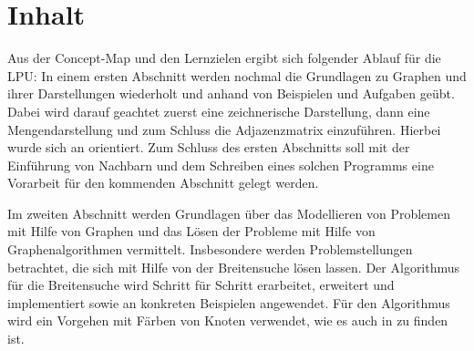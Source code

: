 \section{Inhalt}\label{lpu:inhalt}

Aus der Concept-Map und den Lernzielen ergibt sich folgender Ablauf für die LPU:
In einem ersten Abschnitt werden nochmal die Grundlagen zu Graphen und ihrer Darstellungen wiederholt und anhand von Beispielen und Aufgaben geübt. 
Dabei wird darauf geachtet zuerst eine zeichnerische Darstellung, dann eine Mengendarstellung und zum Schluss die Adjazenzmatrix einzuführen. 
Hierbei wurde sich an \cite{cormen,ottmann} orientiert.
Zum Schluss des ersten Abschnitts soll mit der Einführung von Nachbarn und dem Schreiben eines solchen Programms eine Vorarbeit für den kommenden Abschnitt gelegt werden.

Im zweiten Abschnitt werden Grundlagen \"uber das Modellieren von Problemen mit Hilfe von Graphen und das L\"osen der Probleme mit Hilfe von Graphenalgorithmen vermittelt. Insbesondere werden Problemstellungen betrachtet, die sich mit Hilfe von der Breitensuche l\"osen lassen. Der Algorithmus f\"ur die Breitensuche wird Schritt f\"ur Schritt erarbeitet, erweitert und implementiert sowie an konkreten Beispielen angewendet. F\"ur den Algorithmus wird ein Vorgehen mit F\"arben von Knoten verwendet, wie es auch in \cite{cormen} zu finden ist.